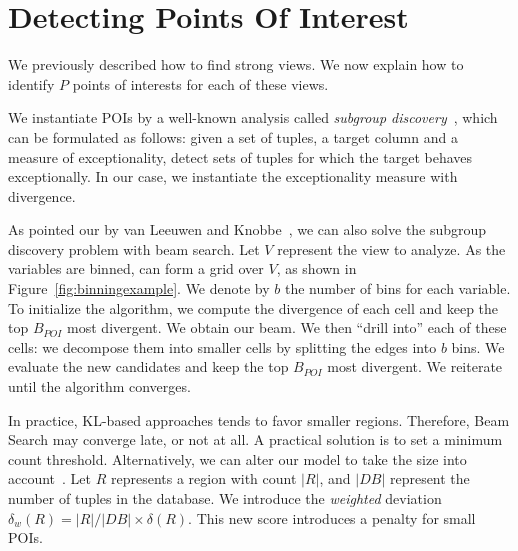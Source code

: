 \section{Detecting Points Of Interest}
\label{sec:detec}

We previously described how to find strong views. We now
explain how to identify $P$ points of interests for each of these views. 

We instantiate POIs by a well-known analysis called
\emph{subgroup discovery}~\cite{klosgen1996explora, wrobel1997algorithm}, which
can be formulated as follows: given a set of tuples, a target column and a
measure of exceptionality, detect sets of tuples for which the target behaves
exceptionally. In our case, we instantiate the exceptionality measure
with divergence. 

As pointed our by van Leeuwen and Knobbe~\cite{van2011non}, we can also solve
the subgroup discovery problem with beam search.  Let $V$ represent the view to
analyze. As the variables are binned, can form a grid over $V$, as shown in
Figure~\ref{fig:binningexample}. We denote by $b$ the number of bins for each
variable. To initialize the algorithm, we compute the divergence of each cell
and keep the top $B_{POI}$ most divergent. We obtain our beam. We then ``drill
into'' each of these cells: we decompose them into smaller cells by splitting
the edges into $b$ bins. We evaluate the new candidates and keep the top
$B_{POI}$ most divergent. We reiterate until the algorithm converges.

In practice, KL-based approaches tends to favor smaller regions. Therefore,
Beam Search may converge late, or not at all. A practical solution is to set a
minimum count threshold. Alternatively, we can alter our model to take the size
into account~\cite{van2011non}. Let $R$ represents a region with count $|R|$,
and $|DB|$ represent the number of tuples in the database. We introduce the
\emph{weighted} deviation $\delta_w(R) = |R|/|DB| \times \delta(R)$. This new
score introduces a penalty for small POIs.







